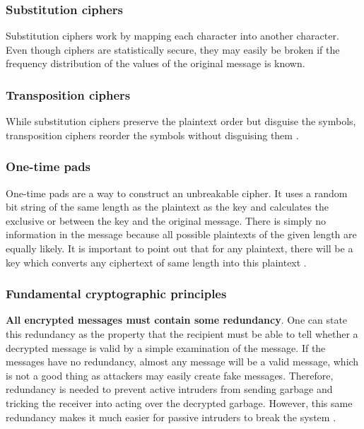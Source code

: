 \subsubsection{Substitution ciphers}

Substitution ciphers work by mapping each character into another character.
Even though ciphers are statistically secure, they may easily be broken if the frequency distribution of the values of the original message is known.

\subsubsection{Transposition ciphers}

While substitution ciphers preserve the plaintext order but disguise the symbols, transposition ciphers reorder the symbols without disguising them \cite[p.~771]{computer-networks-tanenbaum-2012}.

\subsubsection{One-time pads}

One-time pads are a way to construct an unbreakable cipher.
It uses a random bit string of the same length as the plaintext as the key and calculates the exclusive or between the key and the original message.
There is simply no information in the message because all possible plaintexts of the given length are equally likely.
It is important to point out that for any plaintext, there will be a key which converts any ciphertext of same length into this plaintext \cite[p.~772]{computer-networks-tanenbaum-2012}.

\subsubsection{Fundamental cryptographic principles}

\textbf{All encrypted messages must contain some redundancy}.
One can state this redundancy as the property that the recipient must be able to tell whether a decrypted message is valid by a simple examination of the message.
If the messages have no redundancy, almost any message will be a valid message, which is not a good thing as attackers may easily create fake messages.
Therefore, redundancy is needed to prevent active intruders from sending garbage and tricking the receiver into acting over the decrypted garbage.
However, this same redundancy makes it much easier for passive intruders to break the system \cite[p.~778]{computer-networks-tanenbaum-2012}.

